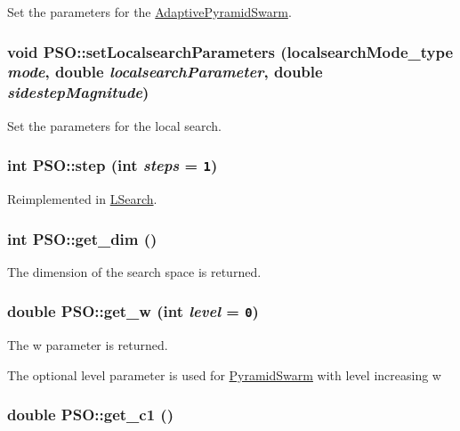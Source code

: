 Set the parameters for the \hyperlink{classAdaptivePyramidSwarm}{AdaptivePyramidSwarm}. 

\hypertarget{classPSO_d58d6a6ba1ebd6df471867389487feab}{
\subsubsection{\setlength{\rightskip}{0pt plus 5cm}void PSO::setLocalsearchParameters ({\bf localsearchMode\_\-type} {\em mode}, \/  double {\em localsearchParameter}, \/  double {\em sidestepMagnitude})}}
\label{classPSO_d58d6a6ba1ebd6df471867389487feab}


Set the parameters for the local search. 

\hypertarget{classPSO_3a301551494012faac2c6db981ae269e}{
\subsubsection{\setlength{\rightskip}{0pt plus 5cm}int PSO::step (int {\em steps} = {\tt 1})}}
\label{classPSO_3a301551494012faac2c6db981ae269e}




Reimplemented in \hyperlink{classLSearch_bac6ce81e34ee717b854ec1772962883}{LSearch}.\hypertarget{classPSO_9da7242360b57a226143a6b60547021b}{
\subsubsection{\setlength{\rightskip}{0pt plus 5cm}int PSO::get\_\-dim ()}}
\label{classPSO_9da7242360b57a226143a6b60547021b}


The dimension of the search space is returned. 

\hypertarget{classPSO_cb91e8b9fd0329a817d7d435ca75c718}{
\subsubsection{\setlength{\rightskip}{0pt plus 5cm}double PSO::get\_\-w (int {\em level} = {\tt 0})}}
\label{classPSO_cb91e8b9fd0329a817d7d435ca75c718}


The w parameter is returned. 

The optional level parameter is used for \hyperlink{classPyramidSwarm}{PyramidSwarm} with level increasing w \hypertarget{classPSO_93bb160787761b05a7a8512771ac0117}{
\subsubsection{\setlength{\rightskip}{0pt plus 5cm}double PSO::get\_\-c1 ()}}
\label{classPSO_93bb160787761b05a7a8512771ac0117}


